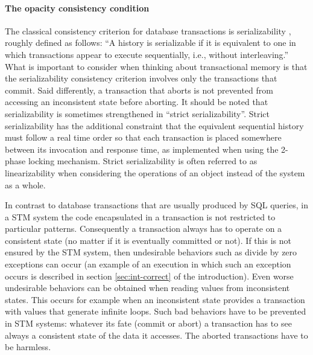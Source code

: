 \paragraph{The opacity consistency condition}
The classical consistency criterion for database
transactions is serializability \cite{P79},
roughly defined as follows: ``A history is serializable if it is equivalent to one in which
transactions appear to execute sequentially, i.e., without interleaving.''
What is important to consider when thinking about transactional memory
is that the serializability  consistency criterion 
involves only the transactions that commit. Said differently, 
a transaction  that aborts is not prevented from accessing an inconsistent
state   before aborting. 
It should be noted that serializability is sometimes strengthened in ``strict
serializability''.
Strict serializability has the additional constraint that the equivalent sequential history
must follow a real time order so that each transaction is placed somewhere between its
invocation and response time,
as  implemented  when   using   the   2-phase  locking
mechanism.
Strict serializability is often referred to as linearizability \cite{HW90}  when considering the operations
of an object instead of the system as a whole.

In contrast to database transactions that 
are usually produced by SQL queries, in  a STM  system the code  
encapsulated in a transaction is not restricted to particular patterns. 
Consequently  a transaction always has to operate on a consistent state
(no matter if it is eventually committed or not).
If this is not ensured by the STM system, then undesirable
behaviors such as divide by zero exceptions can occur
(an example of an execution in which such an exception occurs
is described in section \ref{sec:int-correct} of the introduction).
Even worse undesirable  behaviors can  be
obtained when  reading values from inconsistent  states. 
This occurs for example when an inconsistent state provides a transaction 
with values that generate infinite loops.
Such  bad  behaviors have  to  be prevented in  STM systems: 
whatever its fate (commit or abort) a transaction has to see always  
a consistent  state of  the data it  accesses. The aborted transactions
have to be harmless.  



